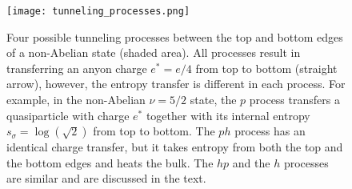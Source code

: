 \documentclass[11pt]{article}
\begin{document}
\begin{figure}[htb]
    \centering
    \texttt{[image: tunneling\_processes.png]}
    \caption{Four possible tunneling processes between the top and bottom edges of a non-Abelian state (shaded area). All processes result in transferring an anyon charge \( e^* = e/4 \) from top to bottom (straight arrow), however, the entropy transfer is different in each process. For example, in the non-Abelian \(\nu = 5/2\) state, the \( p \) process transfers a quasiparticle with charge \( e^* \) together with its internal entropy \( s_{\sigma} = \log(\sqrt{2}) \) from top to bottom. The \( ph \) process has an identical charge transfer, but it takes entropy from both the top and the bottom edges and heats the bulk. The \( hp \) and the \( h \) processes are similar and are discussed in the text.}
    \label{fig:tunneling_processes}
\end{figure}
\end{document}
